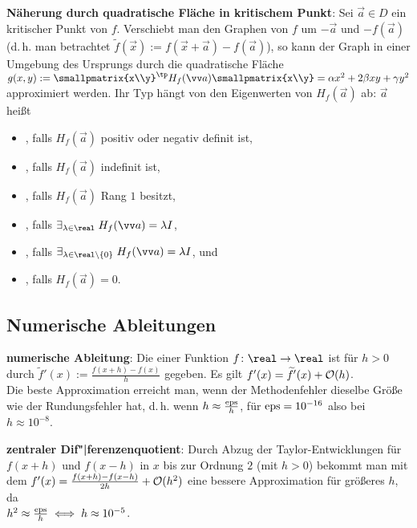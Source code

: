 \textbf{Näherung durch quadratische Fläche in kritischem Punkt}:
Sei $\vec{a} \in D$ ein kritischer Punkt von $f$.
Verschiebt man den Graphen von $f$ um $-\vec{a}$ und $-f(\vec{a})$
(d.\,h. man betrachtet $\widetilde{f}(\vec{x}) := f(\vec{x} + \vec{a}) - f(\vec{a})$),
so kann der Graph in einer Umgebung des Ursprungs durch die quadratische Fläche
$g(x, y) := \smallpmatrix{x\\y}^\tp H_f(\vec{a}) \smallpmatrix{x\\y}
= \alpha x^2 + 2\beta xy + \gamma y^2$
approximiert werden.
Ihr Typ hängt von den Eigenwerten von $H_f(\vec{a})$ ab:
$\vec{a}$ heißt
\begin{itemize}
    \item
    , falls $H_f(\vec{a})$ positiv oder negativ definit ist,

    \item
    , falls $H_f(\vec{a})$ indefinit ist,

    \item
    , falls $H_f(\vec{a})$ Rang $1$ besitzt,

    \item
    , falls $\exists_{\lambda \in \real}\; H_f(\vec{a}) = \lambda I$,

    \item
    , falls
    $\exists_{\lambda \in \real \setminus \{0\}}\; H_f(\vec{a}) = \lambda I$, und

    \item
    , falls $H_f(\vec{a}) = 0$.
\end{itemize}

\subsection{%
    Numerische Ableitungen%
}

\textbf{numerische Ableitung}:
Die  einer Funktion $f\colon \real \to \real$ ist für $h > 0$ durch
$\widetilde{f}'(x) := \frac{f(x + h) - f(x)}{h}$ gegeben.
Es gilt $f'(x) = \widetilde{f}'(x) + \mathcal{O}(h)$.\\
Die beste Approximation erreicht man, wenn der Methodenfehler dieselbe Größe wie der Rundungsfehler
hat, d.\,h. wenn $h \approx \frac{\mathrm{eps}}{h}$, für $\mathrm{eps} = 10^{-16}$ also bei $h \approx 10^{-8}$.

\textbf{zentraler Dif"|ferenzenquotient}:
Durch Abzug der Taylor-Entwicklungen für $f(x + h)$ und $f(x - h)$ in $x$
bis zur Ordnung $2$ (mit $h > 0$) bekommt man mit dem 
$f'(x) = \frac{f(x + h) - f(x - h)}{2h} + \mathcal{O}(h^2)$
eine bessere Approximation für größeres $h$,
da\\ $h^2 \approx \frac{\mathrm{eps}}{h} \iff h \approx 10^{-5}$.

